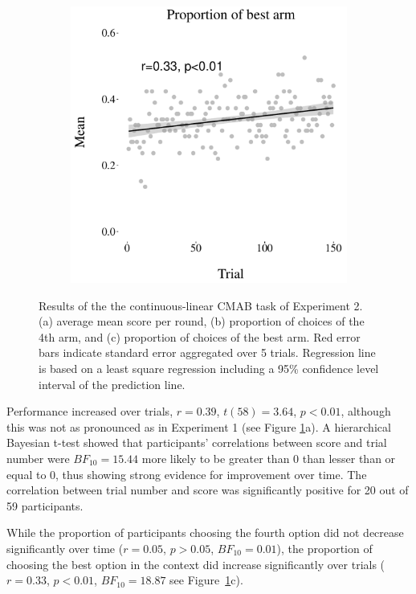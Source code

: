 \documentclass[a4paper,natbib]{apa6}
\begin{document}
\begin{figure}[htbp]
\begin{subfigure}{.32\textwidth}
\caption{}
  \end{subfigure}
\begin{subfigure}{.32\textwidth}
 \centering
\includegraphics[width=.95\textwidth]{figure28.pdf}
\caption{}  
\end{subfigure}
\caption{Results of the the continuous-linear CMAB task of Experiment 2. (a) average mean score per round, (b) proportion of choices of the 4th arm, and (c) proportion of choices of the best arm. Red error bars indicate standard error aggregated over 5 trials. Regression line is based on a least square regression including a 95\% confidence level interval of the prediction line.}
\label{fig:linear}
\end{figure}

Performance increased over trials, $r=0.39$, $t(58)=3.64$,  $p<0.01$, although this was not as pronounced as in Experiment 1 (see Figure \ref{fig:linear}a).  A hierarchical Bayesian t-test showed that participants' correlations between score and trial number were $BF_{10}=15.44$ more likely to be greater than 0 than lesser than or equal to 0, thus showing strong evidence for improvement over time. The correlation between trial number and score was significantly positive for 20 out of 59 participants.

While the proportion of participants choosing the fourth option did not decrease significantly over time ($r=0.05$, $p>0.05$, $BF_{10}=0.01$), the proportion of choosing the best option in the context did increase significantly over trials ($r=0.33$, $p<0.01$, $BF_{10}=18.87$ see Figure~\ref{fig:linear}c). 
\end{document}
